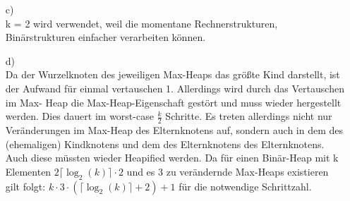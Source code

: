\documentclass[a4paper,11pt,fleqn]{scrartcl}
\begin{document}
\begin{enumerate}
\begin{enumerate}
\begin{array}{rcl}
					 \cdot\log_2(10^8)\rceil &=& 54 \\
					 \cdot\log_2(10^9)\rceil &=& 60 \\
				\end{array}
				\)
			\item[c)]\quad \\
				k = 2 wird verwendet, weil die momentane Rechnerstrukturen, Binärstrukturen
				einfacher verarbeiten können.
			\newpage
			\item[d)]\quad \\
				Da der Wurzelknoten des jeweiligen Max-Heaps das größte Kind darstellt, ist der 
				Aufwand für einmal vertauschen 1. Allerdings wird durch das Vertauschen im Max-
				Heap die Max-Heap-Eigenschaft gestört und muss wieder hergestellt werden. 
				Dies dauert im worst-case $\frac{k}{2}$ Schritte. Es treten allerdings nicht 
				nur Veränderungen im Max-Heap des Elternknotens auf, sondern auch in dem des 
				(ehemaligen) Kindknotens und dem des Elternknotens des Elternknotens. Auch 
				diese müssten wieder Heapified werden. Da für einen Binär-Heap mit k Elementen
				$2\lceil\log_2(k)\rceil\cdot 2$ und es 3 zu verändernde Max-Heaps existieren
				gilt folgt: $k \cdot 3 \cdot (\lceil\log_2(k)\rceil + 2) + 1$ für die 
				notwendige Schrittzahl.
				

\end{enumerate}
\end{enumerate}
\end{document}
